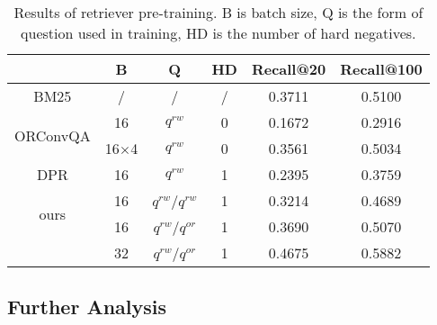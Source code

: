 \begin{table}[t]
  \centering
  \caption{Results of retriever pre-training. B is batch size, Q is the form of question used in training, HD is the number of hard negatives.}
    \vspace{-0.1in}
    \begin{tabular}{cccccc}
    \toprule
          & B & Q & HD & Recall@20 & Recall@100 \\
    \midrule
    BM25  & /     & /     & /     & 0.3711  & 0.5100  \\
    \midrule
    \multicolumn{1}{c}{\multirow{2}[2]{*}{ORConvQA }} & 16    & $q^{rw}$ & 0     & 0.1672  & 0.2916  \\
          & 16$\times$4  & $q^{rw}$ & 0     & 0.3561  & 0.5034  \\
    \midrule
    DPR   & 16    & $q^{rw}$ & 1     & 0.2395  & 0.3759  \\
    \midrule
    \multirow{2}[2]{*}{ours} & 16    & $q^{rw}$/$q^{rw}$ & 1     & 0.3214  & 0.4689  \\
          & 16    & $q^{rw}$/$q^{or}$ & 1     & 0.3690  & 0.5070  \\
          & 32    & $q^{rw}$/$q^{or}$ & 1     & 0.4675  & 0.5882  \\
    \bottomrule
    \end{tabular}%
    \vspace{-0.2in}
  \label{tab:resofpretraining}%
\end{table}%

\vspace{-0.1in}
\subsection{Further Analysis}
